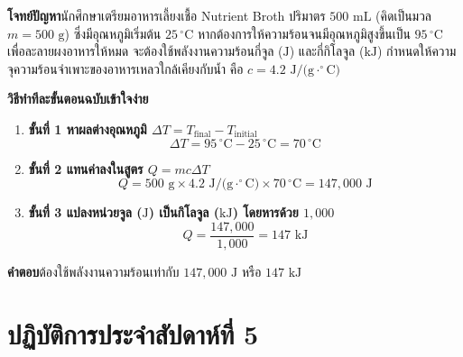 \begin{worked}
\textbf{โจทย์ปัญหา}\quad นักศึกษาเตรียมอาหารเลี้ยงเชื้อ Nutrient Broth ปริมาตร $500\text{ mL}$ (คิดเป็นมวล $m = 500\text{ g}$) ซึ่งมีอุณหภูมิเริ่มต้น $25\,^\circ\text{C}$ หากต้องการให้ความร้อนจนมีอุณหภูมิสูงขึ้นเป็น $95\,^\circ\text{C}$ เพื่อละลายผงอาหารให้หมด จะต้องใช้พลังงานความร้อนกี่จูล ($\text{J}$) และกี่กิโลจูล ($\text{kJ}$) กำหนดให้ความจุความร้อนจำเพาะของอาหารเหลวใกล้เคียงกับน้ำ คือ $c = 4.2\text{ J/(g}\cdot^\circ\text{C)}$

\textbf{วิธีทำทีละขั้นตอนฉบับเข้าใจง่าย}
\begin{enumerate}
    \item \textbf{ขั้นที่ 1 หาผลต่างอุณหภูมิ $\Delta T = T_{\text{final}} - T_{\text{initial}}$}
    \[
        \Delta T = 95\,^\circ\text{C} - 25\,^\circ\text{C} = 70\,^\circ\text{C}
    \]
    \item \textbf{ขั้นที่ 2 แทนค่าลงในสูตร $Q = m c \Delta T$}
    \[
        Q = 500\text{ g} \times 4.2\text{ J/(g}\cdot^\circ\text{C)} \times 70\,^\circ\text{C} = 147{,}000\text{ J}
    \]
    \item \textbf{ขั้นที่ 3 แปลงหน่วยจูล ($\text{J}$) เป็นกิโลจูล ($\text{kJ}$) โดยหารด้วย $1{,}000$}
    \[
        Q = \frac{147{,}000}{1{,}000} = 147\text{ kJ}
    \]
\end{enumerate}
\textbf{คำตอบ}\quad ต้องใช้พลังงานความร้อนเท่ากับ $147{,}000\text{ J}$ หรือ $147\text{ kJ}$
\end{worked}

\section{ปฏิบัติการประจำสัปดาห์ที่ 5}

